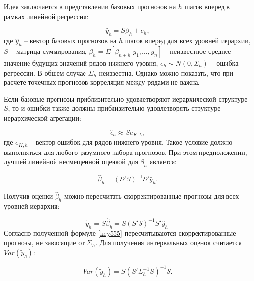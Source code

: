 \documentclass[12pt,a4paper, oneside]{extreport}
\begin{document}
Идея заключается в представлении
базовых прогнозов на $h$ шагов вперед в рамках линейной регрессии:


\begin{equation}\label{abc}
 \hat{y}_h = S \beta_h + e_h  ,
\end{equation}
\noindent
где $ \hat{y}_h $ -- вектор базовых прогнозов  на $h$ шагов вперед для всех уровней иерархии, $S$ --  матрица суммирования, 
$ \beta_h = E [ \beta_{n + h} | y_1 , \dots , y_n ]  $
--  неизвестное среднее значение будущих значений рядов нижнего уровня, 
$ e_h \sim N(0,\Sigma_h ) $ -- ошибка регрессии. 
В общем случае $\Sigma_h$ неизвестна. Однако можно показать, что при расчете точечных прогнозов корреляция между рядами не важна. 

Если базовые прогнозы приблизительно удовлетворяют  иерархической структуре $S$, то и ошибки также должны приблизительно удовлетворять структуре иерархической агрегации:

\begin{equation}\label{key}
\hat{e}_h \approx S  e_{K,h}  ,
\end{equation}
\noindent
где $e_{K,h}$  -- вектор ошибок для рядов нижнего уровня. 
Такое условие  должно выполняться  для любого разумного набора прогнозов. 
При этом предположении,  лучшей  линейной несмещенной оценкой   для $\beta_h$ является:

\begin{equation}\label{key}
\hat{\beta}_h = ( S'  S )^{-1}  S'    \hat{y}_h .
\end{equation}

Получив оценки $\hat{\beta}_h $ можно пересчитать скорректированные прогнозы для всех уровней иерархии:

\begin{equation}\label{key555}
 \tilde{y}_h
= S \hat{\beta}_h  = S ( S'  S )^{-1}  S'    \hat{y}_h .
\end{equation}
 Согласно полученной формуле \ref{key555} пересчитываются скорректированные  прогнозы, не зависящие  от  $\Sigma_h$. 
 Для получения интервальных оценок считается   $Var(\tilde{y}_h)$:
 
\begin{equation}\label{key}
Var(\tilde{y}_h) =  S (S'\Sigma_h^{-1} S)^{−1}S.
\end{equation}
\end{document}
